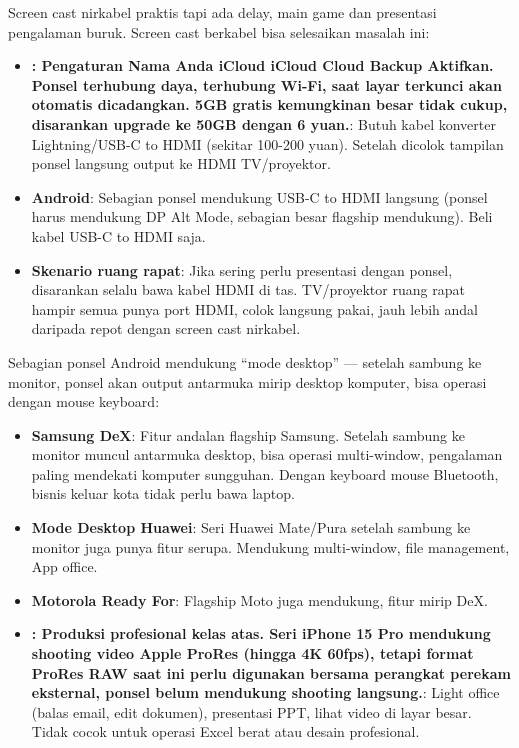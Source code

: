 
Screen cast nirkabel praktis tapi ada delay, main game dan presentasi pengalaman buruk. Screen cast berkabel bisa selesaikan masalah ini:

\begin{itemize}
  \item \textbf{: Pengaturan Nama Anda iCloud iCloud Cloud Backup Aktifkan. Ponsel terhubung daya, terhubung Wi-Fi, saat layar terkunci akan otomatis dicadangkan. 5GB gratis kemungkinan besar tidak cukup, disarankan upgrade ke 50GB dengan 6 yuan.}: Butuh kabel konverter Lightning/USB-C to HDMI (sekitar 100-200 yuan). Setelah dicolok tampilan ponsel langsung output ke HDMI TV/proyektor.
  \item \textbf{Android}: Sebagian ponsel mendukung USB-C to HDMI langsung (ponsel harus mendukung DP Alt Mode, sebagian besar flagship mendukung). Beli kabel USB-C to HDMI saja.
  \item \textbf{Skenario ruang rapat}: Jika sering perlu presentasi dengan ponsel, disarankan selalu bawa kabel HDMI di tas. TV/proyektor ruang rapat hampir semua punya port HDMI, colok langsung pakai, jauh lebih andal daripada repot dengan screen cast nirkabel.
\end{itemize}


Sebagian ponsel Android mendukung “mode desktop” — setelah sambung ke monitor, ponsel akan output antarmuka mirip desktop komputer, bisa operasi dengan mouse keyboard:

\begin{itemize}
  \item \textbf{Samsung DeX}: Fitur andalan flagship Samsung. Setelah sambung ke monitor muncul antarmuka desktop, bisa operasi multi-window, pengalaman paling mendekati komputer sungguhan. Dengan keyboard mouse Bluetooth, bisnis keluar kota tidak perlu bawa laptop.
  \item \textbf{Mode Desktop Huawei}: Seri Huawei Mate/Pura setelah sambung ke monitor juga punya fitur serupa. Mendukung multi-window, file management, App office.
  \item \textbf{Motorola Ready For}: Flagship Moto juga mendukung, fitur mirip DeX.
  \item \textbf{: Produksi profesional kelas atas. Seri iPhone 15 Pro mendukung shooting video Apple ProRes (hingga 4K 60fps), tetapi format ProRes RAW saat ini perlu digunakan bersama perangkat perekam eksternal, ponsel belum mendukung shooting langsung.}: Light office (balas email, edit dokumen), presentasi PPT, lihat video di layar besar. Tidak cocok untuk operasi Excel berat atau desain profesional.
\end{itemize}


